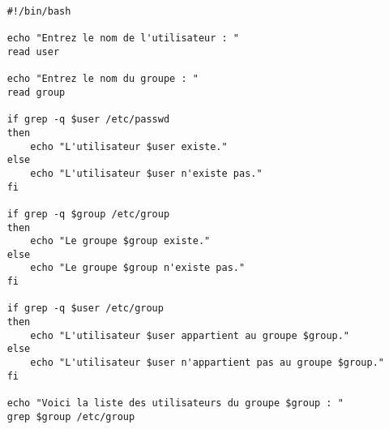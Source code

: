 \documentclass[12pt, a4paper]{article}
\begin{document}
\begin{lstlisting}
    #!/bin/bash

    echo "Entrez le nom de l'utilisateur : "
    read user

    echo "Entrez le nom du groupe : "
    read group

    if grep -q $user /etc/passwd
    then
        echo "L'utilisateur $user existe."
    else
        echo "L'utilisateur $user n'existe pas."
    fi

    if grep -q $group /etc/group
    then
        echo "Le groupe $group existe."
    else
        echo "Le groupe $group n'existe pas."
    fi

    if grep -q $user /etc/group
    then
        echo "L'utilisateur $user appartient au groupe $group."
    else
        echo "L'utilisateur $user n'appartient pas au groupe $group."
    fi

    echo "Voici la liste des utilisateurs du groupe $group : "
    grep $group /etc/group

\end{lstlisting}
\end{document}
